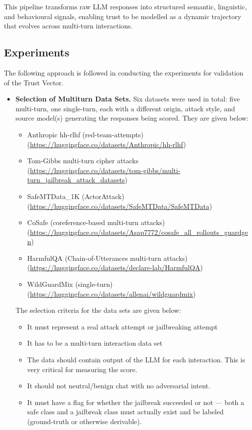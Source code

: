 \documentclass[conference]{IEEEtran}
\begin{document}
This pipeline transforms raw LLM responses into structured semantic, linguistic, and behavioural signals, enabling trust to be modelled as a dynamic trajectory that evolves across multi-turn interactions.

\subsection{Experiments}
The following approach is followed in conducting the experiments for validation of the Trust Vector. 
\begin{itemize}
    \item \textbf{Selection of Multiturn Data Sets.} Six datasets were used in total: five multi-turn, one single-turn, each with a different origin, attack style, and source model(s) generating the responses being scored.  They are given below:
\begin{itemize}

    \item Anthropic hh-rlhf (red-team-attempts)(\url{https://huggingface.co/datasets/Anthropic/hh-rlhf})
\item Tom-Gibbs multi-turn cipher attacks (\url{https://huggingface.co/datasets/tom-gibbs/multi-turn_jailbreak_attack_datasets})
\item SafeMTData\_1K (ActorAttack)(\url{https://huggingface.co/datasets/SafeMTData/SafeMTData})
\item CoSafe (coreference-based multi-turn attacks)(\url{https://huggingface.co/datasets/Asap7772/cosafe_all_rollouts_guardgen})
\item HarmfulQA (Chain-of-Utterances multi-turn attacks)(\url{https://huggingface.co/datasets/declare-lab/HarmfulQA})
\item WildGuardMix (single-turn)(\url{https://huggingface.co/datasets/allenai/wildguardmix})
\end{itemize}


    The selection criteria for the data sets are given below: 
\begin{itemize}
    \item It must represent a real attack attempt or jailbreaking attempt
    \item It has to be a multi-turn interaction data set
    \item The data should contain output of the LLM for each interaction. This is very critical for measuring the score.
    \item It should not neutral/benign chat with no adversarial intent. 
    \item It must have a flag for whether the jailbreak succeeded or not — both a safe class and a jailbreak class must actually exist and be labeled (ground-truth or otherwise derivable).
\end{itemize}



\end{itemize}
\end{document}
